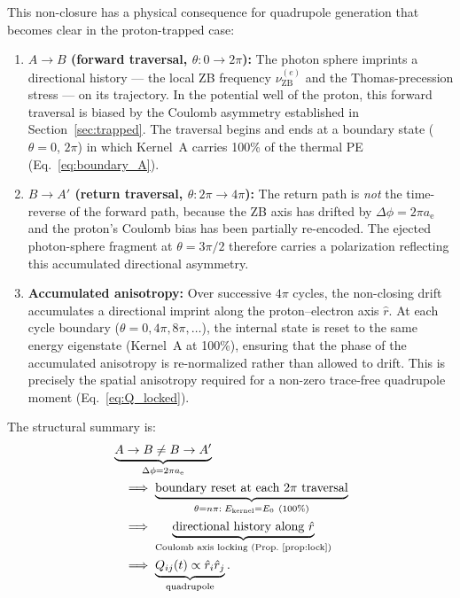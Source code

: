 \documentclass[%
 reprint, amsmath,amssymb, aps, prd, ]{revtex4-2}
\numberwithin{equation}{section}
\newcommand{\iphase}{\theta}
\newcommand{\anom}{a_{\mathrm{e}}}
\begin{document}
This non-closure has a physical consequence for quadrupole generation that becomes clear in the proton-trapped case:
\begin{enumerate}[label=(\roman*), leftmargin=2em, itemsep=4pt]
\item \textbf{$A \to B$ (forward traversal, $\iphase: 0 \to 2\pi$):} The photon sphere imprints a directional history --- the local ZB frequency $\nu_\mathrm{ZB}^{(e)}$ and the Thomas-precession stress --- on its trajectory. In the potential well of the proton, this forward traversal is biased by the Coulomb asymmetry established in Section~\ref{sec:trapped}. The traversal begins and ends at a boundary state ($\iphase = 0$, $2\pi$) in which Kernel~A carries 100\% of the thermal PE (Eq.~\eqref{eq:boundary_A}).
\item \textbf{$B \to A'$ (return traversal, $\iphase: 2\pi \to 4\pi$):} The return path is \emph{not} the time-reverse of the forward path, because the ZB axis has drifted by $\Delta\phi = 2\pi\anom$ and the proton's Coulomb bias has been partially re-encoded. The ejected photon-sphere fragment at $\iphase = 3\pi/2$ therefore carries a polarization reflecting this accumulated directional asymmetry.
\item \textbf{Accumulated anisotropy:} Over successive $4\pi$ cycles, the non-closing drift accumulates a directional imprint along the proton--electron axis $\hat{r}$. At each cycle boundary ($\iphase = 0, 4\pi, 8\pi, \ldots$), the internal state is reset to the same energy eigenstate (Kernel~A at 100\%), ensuring that the phase of the accumulated anisotropy is re-normalized rather than allowed to drift. This is precisely the spatial anisotropy required for a non-zero trace-free quadrupole moment (Eq.~\eqref{eq:Q_locked}).
\end{enumerate}

The structural summary is:
\begin{align}
&\underbrace{A \to B \neq B \to A'}_{\Delta\phi = 2\pi\anom}
\notag\\
&\quad\Longrightarrow\;
\underbrace{\text{boundary reset at each }2\pi\text{ traversal}}_{\iphase = n\pi:\; E_\mathrm{kernel} = E_0\ (100\%)}
\notag\\
&\quad\Longrightarrow\;
\underbrace{\text{directional history along }\hat{r}}_{\text{Coulomb axis locking (Prop.~\ref{prop:lock})}}
\notag\\
&\quad\Longrightarrow\;
\underbrace{Q_{ij}(t) \propto \hat{r}_i\hat{r}_j}_{\text{quadrupole}}.
\label{eq:nonclose_chain}
\end{align}
\end{document}

